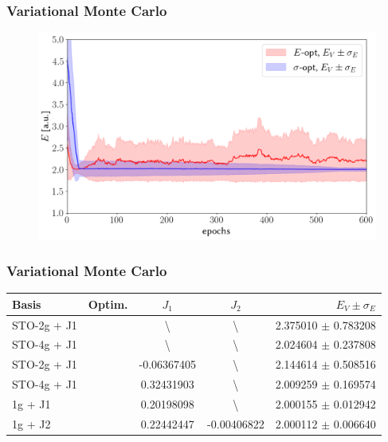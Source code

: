 \documentclass[final,3p,times,twocolumn]{elsarticle}
\newcommand{\cmark}{\ding{51}}%
\newcommand{\xmark}{\ding{55}}%
\begin{document}
	\subsubsection{Variational Monte Carlo}
	\begin{figure}[h]
		\centering
		\includegraphics[width=\linewidth]{../plots/vmc-opt-1g.png}
		\caption{}
		\label{fig:basic-optim}
	\end{figure}
	\subsubsection{Variational Monte Carlo}

	\begin{table}
		\centering
		\begin{tabular}{@{}lcccr@{}} 
			\toprule
			Basis & Optim. & $J_1$ & $J_2$ & $E_V \pm \sigma_E$\\ \midrule
			STO-2g + J1 & \xmark & \textbackslash & \textbackslash & 2.375010 $\pm$ 0.783208 \\ 
			STO-4g + J1 & \xmark & \textbackslash & \textbackslash & 2.024604 $\pm$ 0.237808 \\ 
			STO-2g + J1 & \cmark & -0.06367405 & \textbackslash & 2.144614 $\pm$ 0.508516\\ 
			STO-4g + J1 & \cmark & 0.32431903 & \textbackslash & 2.009259 $\pm$ 0.169574\\ 
			1g + J1 	& \cmark & 0.20198098 & \textbackslash & 2.000155 $\pm$ 0.012942\\ 
			1g + J2 	& \cmark & 0.22442447 & -0.00406822 & 2.000112 $\pm$ 0.006640\\ 
			\bottomrule
		\end{tabular}
	\end{table}
\end{document}
